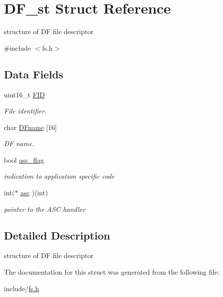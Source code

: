 \hypertarget{structDF__st}{\section{D\-F\-\_\-st Struct Reference}
\label{structDF__st}
}


structure of D\-F file descriptor  




{\ttfamily \#include $<$fs.\-h$>$}

\subsection*{Data Fields}
\begin{DoxyCompactItemize}
\item 
\hypertarget{structDF__st_a36c5cae0b95d253995671c34fac894cf}{uint16\-\_\-t \hyperlink{structDF__st_a36c5cae0b95d253995671c34fac894cf}{F\-I\-D}}\label{structDF__st_a36c5cae0b95d253995671c34fac894cf}

\begin{DoxyCompactList}\small\item\em File identifier. \end{DoxyCompactList}\item 
\hypertarget{structDF__st_aa9afdc4596b4fd8a12d4780e8a1ae7f1}{char \hyperlink{structDF__st_aa9afdc4596b4fd8a12d4780e8a1ae7f1}{D\-Fname} \mbox{[}16\mbox{]}}\label{structDF__st_aa9afdc4596b4fd8a12d4780e8a1ae7f1}

\begin{DoxyCompactList}\small\item\em D\-F name. \end{DoxyCompactList}\item 
\hypertarget{structDF__st_ae5e7c6bdf372bd9fb0ccabf4d806dc61}{bool \hyperlink{structDF__st_ae5e7c6bdf372bd9fb0ccabf4d806dc61}{asc\-\_\-flag}}\label{structDF__st_ae5e7c6bdf372bd9fb0ccabf4d806dc61}

\begin{DoxyCompactList}\small\item\em indication to application specific code \end{DoxyCompactList}\item 
\hypertarget{structDF__st_ac7b544b4e9ece792a081cac91a4f2436}{int($\ast$ \hyperlink{structDF__st_ac7b544b4e9ece792a081cac91a4f2436}{asc} )(int)}\label{structDF__st_ac7b544b4e9ece792a081cac91a4f2436}

\begin{DoxyCompactList}\small\item\em pointer to the A\-S\-C handler \end{DoxyCompactList}\end{DoxyCompactItemize}


\subsection{Detailed Description}
structure of D\-F file descriptor 

The documentation for this struct was generated from the following file\-:\begin{DoxyCompactItemize}
\item 
include/\hyperlink{fs_8h}{fs.\-h}\end{DoxyCompactItemize}
